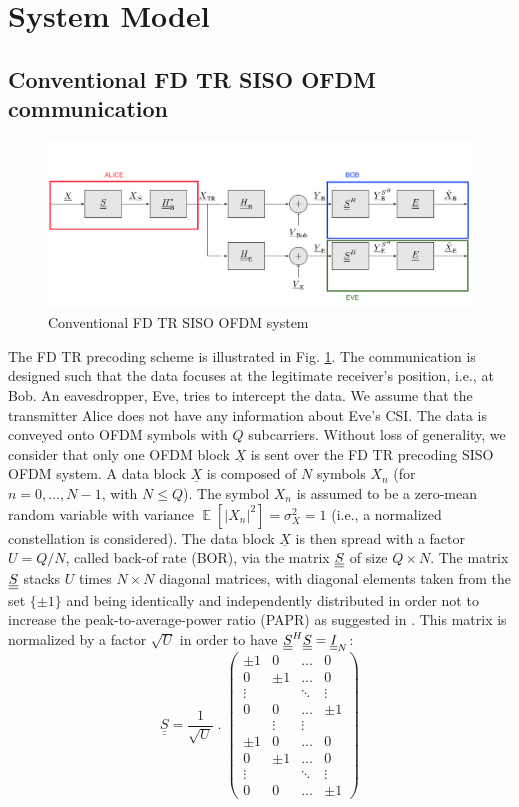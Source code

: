 \documentclass[conference]{IEEEtran}
\begin{document}
\section{System Model}
\label{sec:model}
\subsection{Conventional FD TR SISO OFDM communication}
\label{subsec:traditional_FDTR}

\begin{figure}[t]
    \centering
    \centerline{\includegraphics[width = .53\textwidth]{img/scheme_no_AN.png}}
    \caption{Conventional FD TR SISO OFDM system}
    \label{fig:TR_FD_classical}
\end{figure}
The FD TR precoding scheme is illustrated in Fig. \ref{fig:TR_FD_classical}.  The communication is designed such that the data focuses at the legitimate receiver's position, i.e., at Bob. An eavesdropper, Eve, tries to intercept the data. We assume that the transmitter Alice does not have any information about Eve's CSI. The data is conveyed onto OFDM symbols with $Q$ subcarriers. Without loss of generality, we consider that only one OFDM block $\underline{X}$ is sent over the FD TR precoding SISO OFDM system. A data block $\underline{X}$ is composed of $N$ symbols $X_n$ (for $n = 0,..., N-1$, with $N\leq Q$). The symbol $X_n$ is assumed to be a zero-mean random variable with variance $\mathop{\mathbb{E}}\left[\left|X_n \right|^2\right] = \sigma_X^2 = 1$ (i.e., a normalized constellation is considered). The data block $\underline{X}$ is then spread with a factor $U = Q/N$, called back-of rate (BOR), via the matrix $\underline{\underline{S}}$ of size $Q\times N$. The matrix $\underline{\underline{S}}$ stacks $U$ times $N\times N$ diagonal matrices, with diagonal elements taken from the set $\{\pm1\}$ and being identically and independently distributed in order not to increase the peak-to-average-power ratio (PAPR) as suggested in \cite{papr}. 
This matrix is normalized by a factor $\sqrt{U}$ in order to have $\underline{\underline{S}}^H \underline{\underline{S}} = \underline{\underline{I}}_N$:
\begin{equation}
\underline{\underline{S}} = \frac{1}{\sqrt{U}} \; . \;
   \begin{pmatrix}
    \pm 1 & 0 & \hdots & 0 \\
    0 & \pm 1 & \hdots & 0 \\
    \vdots & & \ddots & \vdots \\
    0 & 0 & \hdots & \pm 1 \\
     & \vdots& \vdots& \\
    \pm 1 & 0 & \hdots & 0 \\
    0 & \pm 1 & \hdots & 0 \\
    \vdots & & \ddots & \vdots \\
    0 & 0 & \hdots & \pm 1
 \end{pmatrix}
 \label{eq:spread_mat}
\end{equation}
\end{document}
